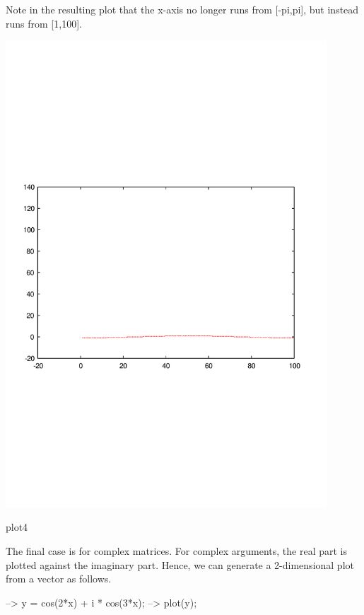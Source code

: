 Note in the resulting plot that the {\ttfamily x}-\/axis no longer runs from {\ttfamily \mbox{[}-\/pi,pi\mbox{]}}, but instead runs from {\ttfamily \mbox{[}1,100\mbox{]}}.  
\begin{DoxyImage}
\includegraphics[width=12cm]{plot4}
\caption{plot4}
\end{DoxyImage}


The final case is for complex matrices. For complex arguments, the real part is plotted against the imaginary part. Hence, we can generate a 2-\/dimensional plot from a vector as follows.


\begin{DoxyVerbInclude}
--> y = cos(2*x) + i * cos(3*x);
--> plot(y);
\end{DoxyVerbInclude}


